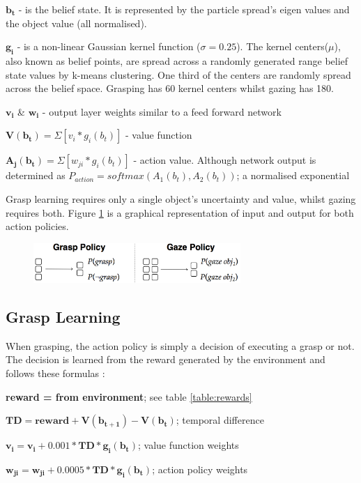 \documentclass[11]{article}
\begin{document}
\begin{list}{}{}
 \item $\pmb{b_t}$ - is the belief state. It is represented by the particle spread's eigen values and the object value (all normalised).
 \item $\pmb{g_i}$ - is a non-linear Gaussian kernel function ($\sigma=0.25$).  The kernel centers($\mu$), also known as belief points, are spread across a randomly generated range belief state values by k-means clustering. One third of the centers are randomly spread across the belief space.
Grasping has 60 kernel centers whilst gazing has 180.
 \item $\pmb{v_i}$ \& $\pmb{w_i}$ - output layer weights similar to a feed forward network
 \item $\pmb{V(b_t)}= \Sigma[v_i * g_i(b_t)]$ - value function
 \item $\pmb{A_j(b_t)}= \Sigma[w_{ji} * g_i(b_t)]$ - action value. Although network output is determined as $P_{action} = softmax(A_1(b_t),A_2(b_t))$; a normalised exponential
\end{list}

Grasp learning requires only a single object's uncertainty and value, whilst gazing  requires both. Figure \ref{fig:inout} is a graphical representation of input and output for both action policies.

\begin{figure}[h]
	\centering
	\includegraphics[width=0.7\textwidth]{inputoutput.png}
	\caption{}
	\label{fig:inout}
\end{figure}

\subsection{Grasp Learning}
When grasping, the action policy is simply a decision of executing a grasp or not. The decision is learned from the reward generated by the environment and follows these formulas : 
\begin{list}{}{}
  \item \textbf{reward =  from environment}; see table \ref{table:rewards}
  \item $\pmb{TD = reward + V(b_{t+1}) - V(b_t)}$; temporal difference
  \item $\pmb{ v_i = v_i + 0.001 * TD * g_i(b_t)}$; value function weights
  \item $\pmb{w_{ji} = w_{ji}+ 0.0005 * TD * g_i(b_t)}$; action policy weights
\end{list}  
\end{document}
